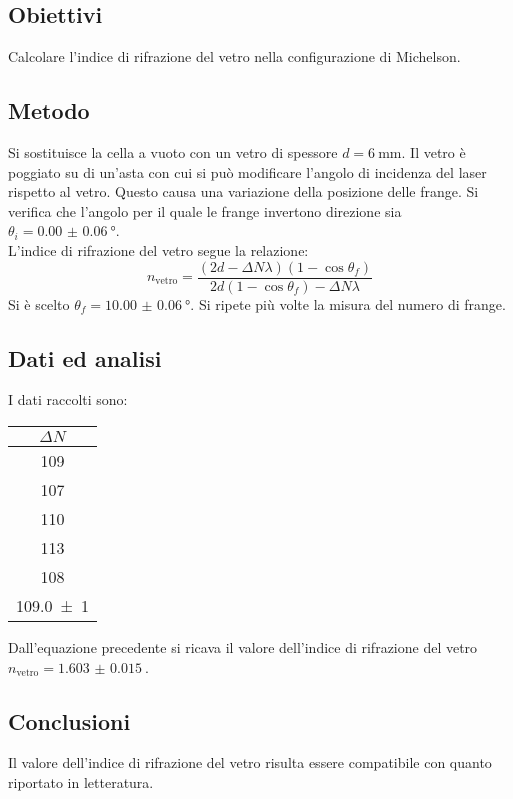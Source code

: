 \documentclass[a4paper]{article}
\begin{document}
\subsection{Obiettivi}
Calcolare l'indice di rifrazione del vetro nella configurazione di Michelson.

\subsection{Metodo}
Si sostituisce la cella a vuoto con un vetro di spessore $d=\SI{6}{\mm}$. Il vetro è poggiato su di un'asta con cui si può modificare l'angolo di incidenza del laser rispetto al vetro. Questo causa una variazione della posizione delle frange. Si verifica che l'angolo per il quale le frange invertono direzione sia $ \theta_i = \SI{0.00(6)}{\degree}$.\\
L'indice di rifrazione del vetro segue la relazione:
\[
	n_\text{vetro} = \frac{\left( 2d - \Delta N\lambda \right)\left( 1 - \cos\theta_f \right)}{2d\left( 1 - \cos\theta_f \right) - \Delta N\lambda}
\]
Si è scelto $\theta_f=\SI{10.00(6)}{\degree}$. Si ripete più volte la misura del numero di frange.

\subsection{Dati ed analisi}
I dati raccolti sono:
\begin{center}
    \begin{tabular}[h]{c}
        $\Delta N$ \\\midrule
        \SI{109}{} \\
        \SI{107}{} \\
        \SI{110}{} \\
        \SI{113}{} \\
        \SI{108}{} \\\midrule
        \SI{109.0(10)}{}
    \end{tabular}\qquad
\end{center}
Dall'equazione precedente si ricava il valore dell'indice di rifrazione del vetro $n_\text{vetro} =\SI{1.603(15)}{}$.

\subsection{Conclusioni}
Il valore dell'indice di rifrazione del vetro risulta essere compatibile con quanto riportato in letteratura.
\end{document}
